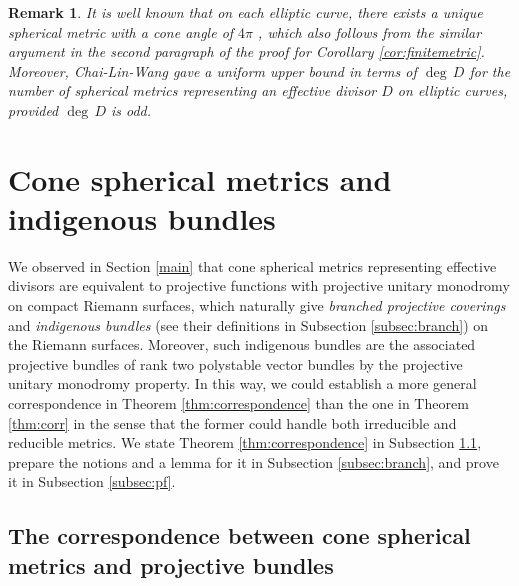 \documentclass[12pt]{article}
\newtheorem{rem}{Remark}[section]
\begin{document}
\begin{rem}
\label{rem:ell}
{\rm It is well known that on each elliptic curve, there exists a unique spherical metric with a cone angle of $4\pi$ \cite[Section 2]{CLW14}, which also follows from the similar argument in the second paragraph of the proof for Corollary \ref{cor:finitemetric}. Moreover, Chai-Lin-Wang \cite{CLWpre} gave a uniform upper bound in terms of $\deg\, D$ for the number of spherical metrics representing an effective divisor $D$ on elliptic curves, provided $\deg\,D$ is odd.}  %
\end{rem}


\section{Cone spherical metrics and indigenous bundles}
\label{sec:bundles}
We observed in Section \ref{main} that cone spherical metrics representing effective divisors  are equivalent to projective functions with projective unitary monodromy on compact Riemann surfaces, which naturally give {\it branched projective coverings} and {\it indigenous bundles} (see their definitions in Subsection \ref{subsec:branch}) on the Riemann surfaces. Moreover, such indigenous bundles are the associated projective bundles of rank two polystable vector bundles by the projective unitary monodromy property. In this way, we could establish a more general correspondence in Theorem \ref{thm:correspondence} than the one in Theorem \ref{thm:corr} in the sense that the former could handle both irreducible and reducible metrics.
We state Theorem \ref{thm:correspondence} in Subsection \ref{subsec:state}, prepare the notions and a lemma for it in Subsection \ref{subsec:branch}, and prove it in Subsection \ref{subsec:pf}.


\subsection{The correspondence between cone spherical metrics and projective bundles}
\label{subsec:state}
\end{document}
